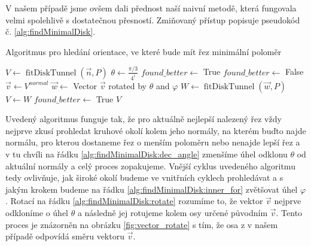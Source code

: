 V našem případě jsme ovšem dali přednost naší naivní metodě, která
fungovala velmi spolehlivě s dostatečnou přesností. Zmiňovaný přístup popisuje
pseudokód č. \ref{alg:findMinimalDisk}.


\begin{algorithm}
\caption{Algoritmus pro hledání orientace, ve které bude mít řez minimální poloměr}
\label{alg:findMinimalDisk}
\begin{algorithmic}[1]


    \State $ V  \gets \operatorname{fitDiskTunnel}(\vec{n}, P) $
        \State $ \theta \gets \frac{\pi / 3}{4^i} $ \label{alg:findMinimalDisk:dec_angle}
        \State $ found\_better \gets $ True
            \State $ found\_better \gets $ False
            \State $ \vec{v} \gets V^{normal} $
             \label{alg:findMinimalDisk:inner_for}
                \State $ \vec{w} \gets$ Vector $\vec{v} $ rotated by $ \theta $ and $\varphi $ \label{alg:findMinimalDisk:rotate}
                \State $ W \gets \operatorname{fitDiskTunnel}(\vec{w}, P) $
                  \label{alg:findMinimalDisk:if}
                    \State $ V \gets W $
                    \State $ found\_better \gets $ True
                \EndIf
            \EndFor
        \EndWhile
    \EndFor
    \State \Return $V$
\EndFunction

\end{algorithmic}
\end{algorithm}

Uvedený algoritmus funguje tak, že pro aktuálně nejlepší nalezený řez vždy nejprve
zkusí prohledat kruhové okolí kolem jeho normály, na kterém buďto najde normálu,
pro kterou dostaneme řez o menším poloměru nebo nenajde lepší řez a v tu chvíli
na řádku \ref{alg:findMinimalDisk:dec_angle} zmenšíme úhel odklonu $ \theta $
od aktuální normály a celý proces zopakujeme.
Vnější cyklus uvedeného algoritmu tedy ovlivňuje, jak široké okolí budeme ve vnitřních
cyklech prohledávat a s jakým krokem budeme na řádku \ref{alg:findMinimalDisk:inner_for}
zvětšovat úhel $\varphi $. Rotací na řádku \ref{alg:findMinimalDisk:rotate} rozumíme to,
že vektor $\vec{v} $ nejprve odkloníme o úhel $ \theta $ a následně jej rotujeme
kolem osy určené původním $\vec{v} $. Tento proces je znázorněn na obrázku
\ref{fig:vector_rotate} s tím, že osa z v našem případě odpovídá směru vektoru
$\vec{v} $.

